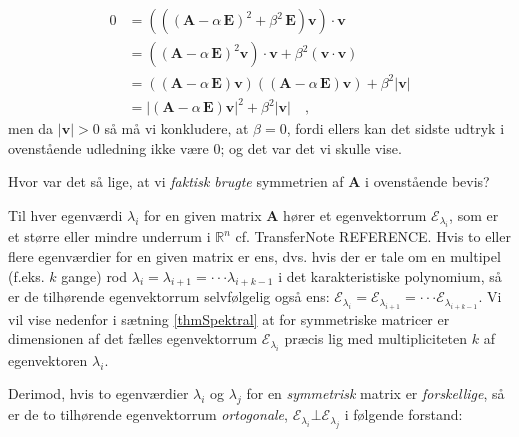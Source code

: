 \begin{bevis}
\begin{equation}
\begin{aligned}
0 &= \left(\left( \left(\mathbf{A} - \alpha\,\mathbf{E} \right)^{2} + \beta^{2}\,\mathbf{E}\right) \mathbf{v}\right)\cdot \mathbf{v} \\
&= \left(\left(\mathbf{A} - \alpha\,\mathbf{E} \right)^{2}\mathbf{v}\right)\cdot \mathbf{v} + \beta^{2}\left(\mathbf{v} \cdot \mathbf{v} \right) \\
&= \left(\left(\mathbf{A} - \alpha\,\mathbf{E} \right)\mathbf{v}\right)\left(\left(\mathbf{A} - \alpha\,\mathbf{E} \right)\mathbf{v}\right) + \beta^{2}\vert \mathbf{v} \vert \\
&= \vert \left(\mathbf{A} - \alpha\,\mathbf{E} \right)\mathbf{v} \vert^{2} + \beta^{2}\vert \mathbf{v} \vert \quad,
\end{aligned}
\end{equation}
men da $\vert \mathbf{v} \vert > 0$ så må vi konkludere, at $\beta = 0$, fordi ellers kan det sidste udtryk i ovenstående udledning ikke være $0$; og det var det vi skulle vise.
\end{bevis}

\begin{exercise}
Hvor var det så lige, at vi {\em{faktisk brugte}} symmetrien af $\mathbf{A}$ i ovenstående bevis?
\end{exercise}

\begin{info}
Til hver egenværdi $\lambda_{i}$ for en given matrix $\mathbf{A}$ hører et egenvektorrum $\mathcal{E}_{\lambda_{i}}$, som er et større eller mindre underrum i $\mathbb{R}^{n}$ cf. TransferNote REFERENCE. Hvis to eller flere egenværdier for en given matrix er ens, dvs. hvis der er tale om en multipel (f.eks. $k$ gange) rod $\lambda_{i} = \lambda_{i+1} = \cdot \cdot \cdot \lambda_{i+k-1}$ i det karakteristiske polynomium, så er de tilhørende egenvektorrum selvfølgelig også ens: $\mathcal{E}_{\lambda_{i}} = \mathcal{E}_{\lambda_{i+1}} = \cdot \cdot \cdot \mathcal{E}_{\lambda_{i+k-1}}$. Vi vil vise nedenfor i sætning \ref{thmSpektral} at for symmetriske matricer er dimensionen af det fælles egenvektorrum $\mathcal{E}_{\lambda_{i}}$ præcis lig med multipliciteten $k$ af egenvektoren $\lambda_{i}$. \bs

Derimod, hvis to egenværdier $\lambda_{i}$ og $\lambda_{j}$ for en {\em{symmetrisk}} matrix er {\em{forskellige}}, så er de to tilhørende egenvektorrum {\em{ortogonale}}, $\mathcal{E}_{\lambda_{i}} \bot \mathcal{E}_{\lambda_{j}}$ i følgende forstand:
\end{info}



